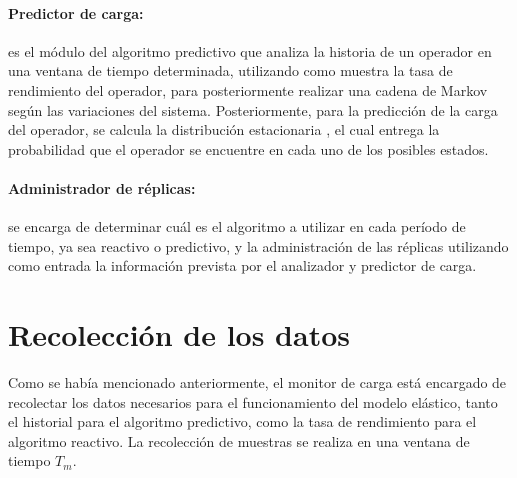 \paragraph{Predictor de carga:} es el m\'odulo del algoritmo predictivo que analiza la historia de un operador en una ventana de tiempo determinada, utilizando como muestra la tasa de rendimiento del operador, para posteriormente realizar una cadena de Markov seg\'un las variaciones del sistema. Posteriormente, para la predicci\'on de la carga del operador, se calcula la distribuci\'on estacionaria \citep{Papoulis1984}, el cual entrega la probabilidad que el operador se encuentre en cada uno de los posibles estados.

\paragraph{Administrador de r\'eplicas:} se encarga de determinar cu\'al es el algoritmo a utilizar en cada per\'iodo de tiempo, ya sea reactivo o predictivo, y la administraci\'on de las r\'eplicas utilizando como entrada la informaci\'on prevista por el analizador y predictor de carga.


\section{Recolecci\'on de los datos}

Como se hab\'ia mencionado anteriormente, el monitor de carga est\'a encargado de recolectar los datos necesarios para el funcionamiento del modelo el\'astico, tanto el historial para el algoritmo predictivo, como la tasa de rendimiento para el algoritmo reactivo. La recolecci\'on de muestras se realiza en una ventana de tiempo $T_m$.


